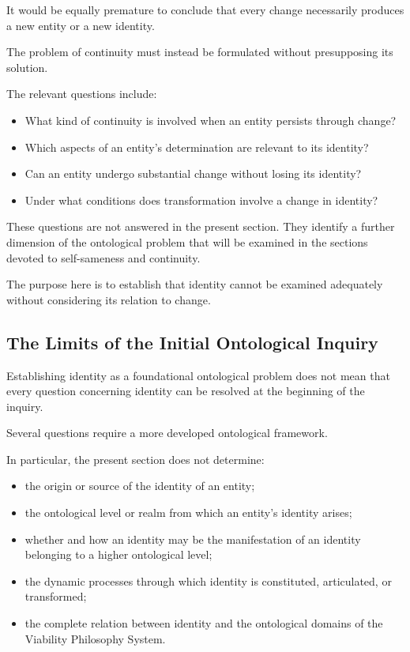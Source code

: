 It would be equally premature to conclude that every
change necessarily produces a new entity or a new
identity.

The problem of continuity must instead be formulated
without presupposing its solution.

The relevant questions include:

\begin{itemize}
    \item What kind of continuity is involved when an
    entity persists through change?
    \item Which aspects of an entity's determination
    are relevant to its identity?
    \item Can an entity undergo substantial change
    without losing its identity?
    \item Under what conditions does transformation
    involve a change in identity?
\end{itemize}

These questions are not answered in the present
section. They identify a further dimension of the
ontological problem that will be examined in the
sections devoted to self-sameness and continuity.

The purpose here is to establish that identity cannot
be examined adequately without considering its
relation to change.



\subsection{The Limits of the Initial Ontological Inquiry}
\label{subsec:limits-of-initial-identity-inquiry}

Establishing identity as a foundational ontological
problem does not mean that every question concerning
identity can be resolved at the beginning of the
inquiry.

Several questions require a more developed
ontological framework.

In particular, the present section does not determine:

\begin{itemize}
    \item the origin or source of the identity of an
    entity;
    \item the ontological level or realm from which
    an entity's identity arises;
    \item whether and how an identity may be the
    manifestation of an identity belonging to a
    higher ontological level;
    \item the dynamic processes through which identity
    is constituted, articulated, or transformed;
    \item the complete relation between identity and
    the ontological domains of the Viability
    Philosophy System.
\end{itemize}

